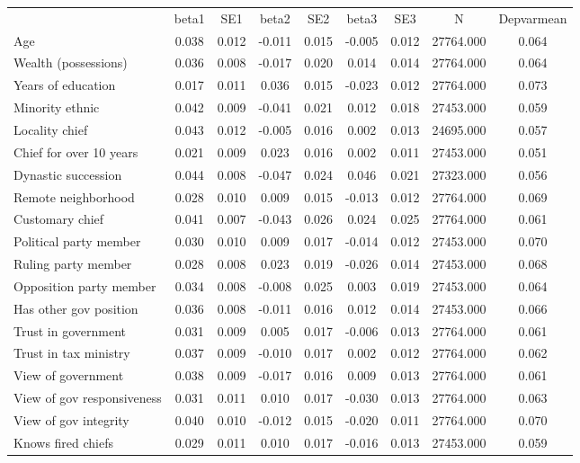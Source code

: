 {\def\sym#1{\ifmmode^{#1}\else\(^{#1}\)\fi} \begin{tabular}{l*{8}{c}} \hline\hline 
& beta1 & SE1 & beta2 & SE2 & beta3 & SE3 & N & Depvarmean \\
Age & 0.038 & 0.012 & -0.011 & 0.015 & -0.005 & 0.012 & 27764.000 & 0.064 \\
Wealth (possessions) & 0.036 & 0.008 & -0.017 & 0.020 & 0.014 & 0.014 & 27764.000 & 0.064 \\
Years of education & 0.017 & 0.011 & 0.036 & 0.015 & -0.023 & 0.012 & 27764.000 & 0.073 \\
Minority ethnic & 0.042 & 0.009 & -0.041 & 0.021 & 0.012 & 0.018 & 27453.000 & 0.059 \\
Locality chief & 0.043 & 0.012 & -0.005 & 0.016 & 0.002 & 0.013 & 24695.000 & 0.057 \\
Chief for over 10 years & 0.021 & 0.009 & 0.023 & 0.016 & 0.002 & 0.011 & 27453.000 & 0.051 \\
Dynastic succession & 0.044 & 0.008 & -0.047 & 0.024 & 0.046 & 0.021 & 27323.000 & 0.056 \\
Remote neighborhood & 0.028 & 0.010 & 0.009 & 0.015 & -0.013 & 0.012 & 27764.000 & 0.069 \\
Customary chief & 0.041 & 0.007 & -0.043 & 0.026 & 0.024 & 0.025 & 27764.000 & 0.061 \\
Political party member & 0.030 & 0.010 & 0.009 & 0.017 & -0.014 & 0.012 & 27453.000 & 0.070 \\
Ruling party member & 0.028 & 0.008 & 0.023 & 0.019 & -0.026 & 0.014 & 27453.000 & 0.068 \\
Opposition party member & 0.034 & 0.008 & -0.008 & 0.025 & 0.003 & 0.019 & 27453.000 & 0.064 \\
Has other gov position & 0.036 & 0.008 & -0.011 & 0.016 & 0.012 & 0.014 & 27453.000 & 0.066 \\
Trust in government & 0.031 & 0.009 & 0.005 & 0.017 & -0.006 & 0.013 & 27764.000 & 0.061 \\
Trust in tax ministry & 0.037 & 0.009 & -0.010 & 0.017 & 0.002 & 0.012 & 27764.000 & 0.062 \\
View of government & 0.038 & 0.009 & -0.017 & 0.016 & 0.009 & 0.013 & 27764.000 & 0.061 \\
View of gov responsiveness & 0.031 & 0.011 & 0.010 & 0.017 & -0.030 & 0.013 & 27764.000 & 0.063 \\
View of gov integrity & 0.040 & 0.010 & -0.012 & 0.015 & -0.020 & 0.011 & 27764.000 & 0.070 \\
Knows fired chiefs & 0.029 & 0.011 & 0.010 & 0.017 & -0.016 & 0.013 & 27453.000 & 0.059 \\

\end{tabular}}

